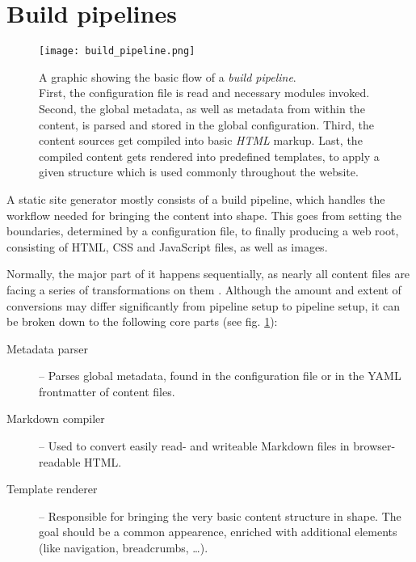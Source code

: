 \section{Build pipelines}
\label{sec:buildpipelines}

\begin{figure} %
    \centering
    \texttt{[image: build\_pipeline.png]}
    \caption{A graphic showing the basic flow of a \emph{build pipeline}.\\
    First, the configuration file is read and necessary modules invoked. Second, the global metadata, as well as metadata from within the content, is parsed and stored in the global configuration. Third, the content sources get compiled into basic \emph{HTML} markup. Last, the compiled content gets rendered into predefined templates, to apply a given structure which is used commonly throughout the website.}
    \label{fig:build-pipeline}
\end{figure}
%

A static site generator mostly consists of a build pipeline, which handles the workflow needed for bringing the content into shape. This goes from setting the boundaries, determined by a configuration file, to finally producing a web root, consisting of HTML, CSS and JavaScript files, as well as images.

Normally, the major part of it happens sequentially, as nearly all content files are facing a series of transformations on them \cite{Metalsmith2015technicaldocumentation}. Although the amount and extent of conversions may differ significantly from pipeline setup to pipeline setup, it can be broken down to the following core parts (see fig. \ref{fig:build-pipeline}):

\begin{description}
  \item[Metadata parser] -- Parses global metadata, found in the configuration file or in the YAML frontmatter of content files.
  \item[Markdown compiler] -- Used to convert easily read- and writeable Markdown files in browser-readable HTML.
  \item[Template renderer] -- Responsible for bringing the very basic content structure in shape. The goal should be a common appearence, enriched with additional elements (like navigation, breadcrumbs, \ldots).
\end{description}

